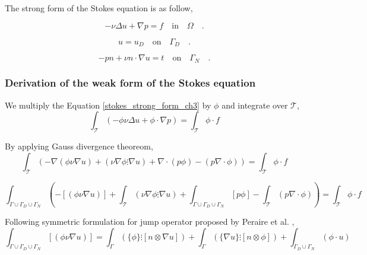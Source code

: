 \documentclass[a4paper]{book}
\begin{document}
The strong form of the Stokes equation is as follow,

\begin{equation} \label{stokes_strong_form_ch3}
-\nu \Delta u + \nabla p = f \quad \textrm{in} \quad \Omega \quad \textrm{.}
\end{equation}

\begin{equation} \label{dirichlet condition stokes_ch3}
u = u_D \quad \textrm{on} \quad \Gamma_D \quad \textrm{.}
\end{equation}

\begin{equation} \label{neumann condition stokes_ch3}
-pn + \nu n \cdot \nabla u = t \quad \textrm{on} \quad \Gamma_N \quad \textrm{.}
\end{equation}


\subsubsection{Derivation of the weak form of the Stokes equation} \label{derivation_weak_stokes}

We multiply the Equation \ref{stokes_strong_form_ch3} by $\phi$ and integrate over $\mathcal{T}$,
\begin{equation}
\int_{\mathcal{T}} (- \phi \nu \Delta u + \phi \cdot \nabla p) = \int_{\mathcal{T}} \phi \cdot f 
\end{equation}

By applying Gauss divergence theoreom,
\begin{equation}
\int_{\mathcal{T}} (-\nabla (\phi \nu \nabla u) + (\nu \nabla \phi \vdots \nabla u) + \nabla \cdot (p \phi) - (p \nabla \cdot \phi)) = \int_{\mathcal{T}} \phi \cdot f 
\end{equation}

\begin{equation}
\int_{\Gamma \cup \Gamma_D \cup \Gamma_N} (- [(\phi \nu \nabla u)] + \int_{\mathcal{T}}  (\nu \nabla \phi \vdots \nabla u) + \int_{\Gamma \cup \Gamma_D \cup \Gamma_N}  [p \phi] - \int_{\mathcal{T}}  (p \nabla \cdot \phi)) = \int_{\mathcal{T}} \phi \cdot f 
\end{equation}

Following symmetric formulation for jump operator proposed by Peraire et al. \cite{peraire},
\begin{equation}
\int_{\Gamma \cup \Gamma_D \cup \Gamma_N} [(\phi \nu \nabla u)] = \int_{\Gamma} (\lbrace \phi \rbrace \vdots [n \otimes \nabla u]) + \int_{\Gamma} (\lbrace \nabla u \rbrace \vdots [n \otimes \phi]) + \int_{\Gamma_D \cup \Gamma_N} (\phi \cdot u ) 
\end{equation}
\end{document}

